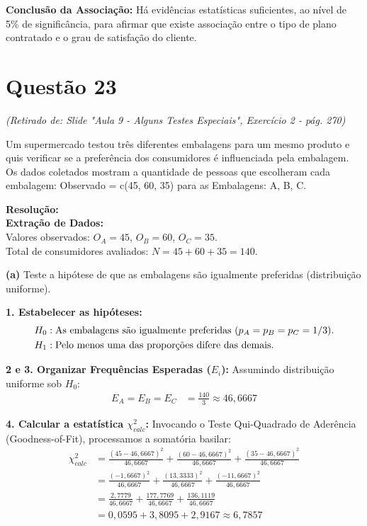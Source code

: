 \documentclass[12pt, a4paper]{article}
\begin{document}
\noindent \textbf{Conclusão da Associação:}
Há evidências estatísticas suficientes, ao nível de 5\% de significância, 
para afirmar que existe associação entre o tipo de plano contratado e o 
grau de satisfação do cliente.

\section*{Questão 23}
\textit{(Retirado de: Slide "Aula 9 - Alguns Testes Especiais", Exercício 2 - pág. 270)}

Um supermercado testou três diferentes embalagens para um mesmo produto e quis verificar se a preferência dos consumidores é influenciada pela embalagem. Os dados coletados mostram a quantidade de pessoas que escolheram cada embalagem: Observado = c(45, 60, 35) para as Embalagens: A, B, C.

\vspace{0.3cm}
\noindent\textbf{Resolução:}\\
\textbf{Extração de Dados:} \\
Valores observados: $O_A = 45$, $O_B = 60$, $O_C = 35$. \\
Total de consumidores avaliados: $N = 45 + 60 + 35 = 140$.

\medskip\noindent\textbf{(a)} Teste a hipótese de que as embalagens são igualmente preferidas (distribuição uniforme).

\noindent \textbf{1. Estabelecer as hipóteses:}
\begin{align*}
H_0 &: \text{As embalagens são igualmente preferidas ($p_A = p_B = p_C = \normalsize 1/3$).} \\
H_1 &: \text{Pelo menos uma das proporções difere das demais.}
\end{align*}

\noindent \textbf{2 e 3. Organizar Frequências Esperadas ($E_i$):}
Assumindo distribuição uniforme sob $H_0$:
\begin{align*}
E_A = E_B = E_C &= \frac{140}{3} \approx \boxed{46{,}6667}
\end{align*}

\noindent \textbf{4. Calcular a estatística $\chi^2_{calc}$:}
Invocando o Teste Qui-Quadrado de Aderência (Goodness-of-Fit), processamos a somatória basilar:
\begin{align*}
\chi^2_{calc} &= \frac{(45 - 46{,}6667)^2}{46{,}6667} + \frac{(60 - 46{,}6667)^2}{46{,}6667} + \frac{(35 - 46{,}6667)^2}{46{,}6667} \\
&= \frac{(-1{,}6667)^2}{46{,}6667} + \frac{(13{,}3333)^2}{46{,}6667} + \frac{(-11{,}6667)^2}{46{,}6667} \\
&= \frac{2{,}7779}{46{,}6667} + \frac{177{,}7769}{46{,}6667} + \frac{136{,}1119}{46{,}6667} \\
&= 0{,}0595 + 3{,}8095 + 2{,}9167 \approx \boxed{6{,}7857}
\end{align*}
\end{document}
